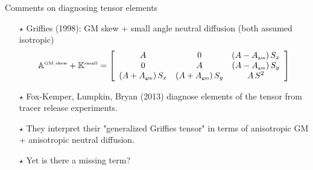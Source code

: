 \documentclass{beamer}
\begin{document}
\begin{frame}{Comments on diagnosing tensor elements}

\begin{itemize}

\item[$\star$] Griffies (1998): GM skew + small angle neutral diffusion (both assumed isotropic)
\begin{equation}
 \mathbb{A}^{\mbox{\tiny GM skew}} + \mathbb{K}^{\mbox{\tiny small}}
=
\left[
 \begin{array}{ccc}
 A & 0 & (A - A_{\mbox{\tiny gm}}) \, S_{x}
 \\
 0 &  A & (A - A_{\mbox{\tiny gm}}) \, S_{y}
 \\
 (A + A_{\mbox{\tiny gm}}) \, S_{x}
 &
 (A + A_{\mbox{\tiny gm}}) \, S_{y}
 &
 A \, S^{2}
 \end{array} 
 \right]
 \label{eq:diffusion-plus-gm-skew}
\end{equation}

\item[$\star$] Fox-Kemper, Lumpkin, Bryan (2013) diagnose elements of the tensor from tracer release experiments. 

\item[$\star$] They interpret their "generalized Griffies tensor" in terms of anisotropic GM + anisotropic neutral diffusion.

\item[$\star$] Yet is there a missing term? 

\end{itemize}
\end{frame}
\end{document}
